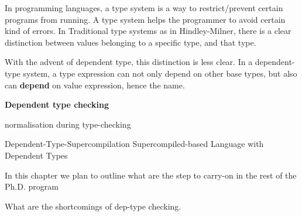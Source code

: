 In programming languages, a type system is a way to restrict/prevent certain programs from running.
A type system helps the programmer to avoid certain kind of errors.
In Traditional type systems as in Hindley-Milner, there is a clear distinction between values belonging to a specific type, and that type.

With the advent of dependent type, this distinction is less clear.
In a dependent-type system, a type expression can not only depend on other base types, but also can \textbf{depend} on value expression, hence the name.

\textbf{Dependent type checking}



normalisation during type-checking


Dependent-Type-Supercompilation
Supercompiled-based Language with Dependent Types


In this chapter we plan to outline what are the step to carry-on in the rest of the Ph.D. program

What are the shortcomings of dep-type checking.